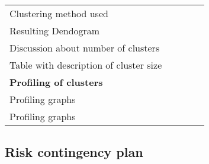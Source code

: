 \begin{table}[H]
\begin{tabular}{@{}l|c|c|c|c@{}}
Clustering method used                          &    &    &    &    \\
Resulting Dendogram                             &    &    &    &    \\
Discussion about number of clusters             &    &    &    &    \\
Table with description of cluster size          &    &    &    &    \\ \midrule
\textbf{Profiling of clusters}                  &    &    &    &    \\
Profiling graphs                                &    &    &    &    \\
Profiling graphs                                &    &    &    &    \\ \bottomrule
\end{tabular}
\end{table}

\subsection{Risk contingency plan}%
\label{sub:risk_contingency_plan}


